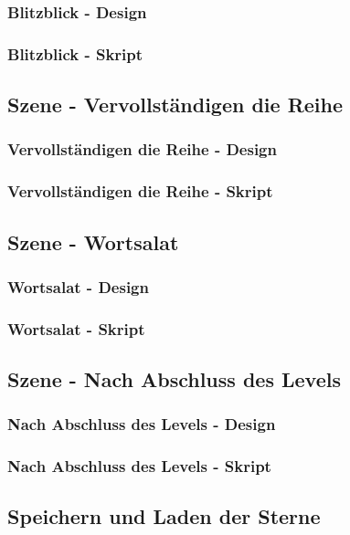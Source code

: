 \subsubsection{Blitzblick - Design}
\subsubsection{Blitzblick - Skript}
\subsection{Szene - Vervollständigen die Reihe}
\subsubsection{Vervollständigen die Reihe - Design}
\subsubsection{Vervollständigen die Reihe - Skript}
\subsection{Szene - Wortsalat}
\subsubsection{Wortsalat - Design}
\subsubsection{Wortsalat - Skript}
\subsection{Szene - Nach Abschluss des Levels}
\subsubsection{Nach Abschluss des Levels - Design}
\subsubsection{Nach Abschluss des Levels - Skript}
\subsection{Speichern und Laden der Sterne}
